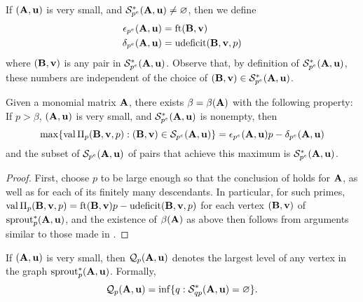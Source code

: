 \documentclass{amsart}
\begin{document}
\begin{definition}%
   \label{epsilon delta: D}
   If $(\mathbf{A},\mathbf{u})$ is very small, and $\mathcal{S}^{\ast}_{p^e}(\mathbf{A},\mathbf{u}) \neq \varnothing$, then we define
   \begin{align*}
     \epsilon_{p^e}(\mathbf{A},\mathbf{u}) & = \operatorname{ft}(\mathbf{B}, \mathbf{v}) \\
     \delta_{p^e}(\mathbf{A},\mathbf{u}) & = \operatorname{udeficit}(\mathbf{B},\mathbf{v},p)
   \end{align*}
   where $(\mathbf{B},\mathbf{v})$ is any pair in $\mathcal{S}^{\ast}_{p^e}(\mathbf{A},\mathbf{u})$.
   Observe that, by definition of $\mathcal{S}^{\ast}_{p^e}(\mathbf{A},\mathbf{u})$, these numbers are independent of the choice of $(\mathbf{B},\mathbf{v}) \in \mathcal{S}^{\ast}_{p^e}(\mathbf{A},\mathbf{u})$.
\end{definition}

\begin{proposition}
   \label{p large graph: P}
   Given a monomial matrix $\mathbf{A}$, there exists $\beta = \beta(\mathbf{A})$ with the following property\textup:
   If $p > \beta$, $(\mathbf{A},\mathbf{u})$ is very small, and $\mathcal{S}_{p^e}^{\ast}(\mathbf{A},\mathbf{u})$ is nonempty, then
   \[
      \max \{ \operatorname{val} \Pi_p(\mathbf{B},\mathbf{v},p) : (\mathbf{B},\mathbf{v}) \in \mathcal{S}_{p^e}(\mathbf{A},\mathbf{u}) \} = \epsilon_{p^e}(\mathbf{A},\mathbf{u}) p-\delta_{p^e}(\mathbf{A},\mathbf{u})
   \]
   and the subset of $\mathcal{S}_{p^e}(\mathbf{A},\mathbf{u})$ of pairs that achieve this maximum is $\mathcal{S}^{\ast}_{p^e}(\mathbf{A},\mathbf{u})$.
\end{proposition}

\begin{proof}
   First, choose $p$ to be large enough so that the conclusion of  holds for $\mathbf{A}$, as well as for each of its finitely many descendants.
   In particular, for such primes, $\operatorname{val} \Pi_p(\mathbf{B},\mathbf{v},p) = \operatorname{ft}(\mathbf{B}, \mathbf{v})p-\operatorname{udeficit}(\mathbf{B},\mathbf{v},p)$  for each vertex $(\mathbf{B},\mathbf{v})$ of $\operatorname{sprout}_p^{\ast}(\mathbf{A},\mathbf{u})$, and the existence of $\beta(\mathbf{A})$ as above then follows from arguments similar to those made in .
\end{proof}

\begin{definition}
   If $(\mathbf{A},\mathbf{u})$ is very small, then $\mathcal{Q}_p(\mathbf{A},\mathbf{u})$ denotes the largest level of any vertex in the graph $\operatorname{sprout}_p^{\ast}(\mathbf{A},\mathbf{u})$.
   Formally,
   \[
      \mathcal{Q}_p(\mathbf{A},\mathbf{u}) = \inf \{ q :  \mathcal{S}^{\ast}_{qp}(\mathbf{A},\mathbf{u}) = \varnothing \}.
   \]
\end{definition}
\end{document}
